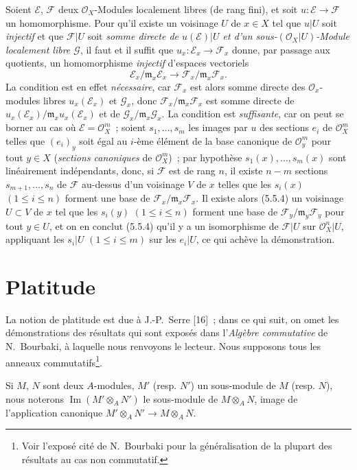 \begin{env}[5.5.5]
\label{0.5.5.5-fr}
Soient $\mathcal{E}$, $\mathcal{F}$ deux $\mathcal{O}_X$-Modules localement
libres (de rang fini), et soit $u:\mathcal{E}\to\mathcal{F}$ un
homomorphisme. Pour qu'il existe un voisinage $U$ de $x\in X$ tel que $u|U$
soit \emph{injectif} et que $\mathcal{F}|U$ soit \emph{somme directe de
$u(\mathcal{E})|U$ et d'un sous-$(\mathcal{O}_X|U)$-Module localement libre
$\mathcal{G}$}, il faut et il suffit que
$u_x:\mathcal{E}_x\to\mathcal{F}_x$ donne, par passage aux quotients, un
homomorphisme \emph{injectif} d'espaces vectoriels
\[
  \mathcal{E}_x/\mathfrak{m}_x\mathcal{E}_x
  \longrightarrow
  \mathcal{F}_x/\mathfrak{m}_x\mathcal{F}_x.
\]
La condition est en effet \emph{nécessaire}, car $\mathcal{F}_x$ est alors
somme directe des $\mathcal{O}_x$-modules libres $u_x(\mathcal{E}_x)$ et
$\mathcal{G}_x$, donc $\mathcal{F}_x/\mathfrak{m}_x\mathcal{F}_x$ est somme
directe de
$u_x(\mathcal{E}_x)/\mathfrak{m}_x u_x(\mathcal{E}_x)$ et de
$\mathcal{G}_x/\mathfrak{m}_x\mathcal{G}_x$. La condition est
\emph{suffisante}, car on peut se borner au cas où
$\mathcal{E}=\mathcal{O}_X^m$~; soient $s_1,\ldots,s_m$ les images par $u$ des
sections $e_i$ de $\mathcal{O}_X^m$ telles que $(e_i)_y$ soit égal au $i$-ème
élément de la base canonique de $\mathcal{O}_y^m$ pour tout $y\in X$
(\emph{sections canoniques} de $\mathcal{O}_X^m$)~; par hypothèse
$s_1(x),\ldots,s_m(x)$ sont linéairement indépendants, donc, si $\mathcal{F}$
est de rang $n$, il existe $n-m$ sections $s_{m+1},\ldots,s_n$ de
$\mathcal{F}$ au-dessus d'un voisinage $V$ de $x$ telles que les $s_i(x)$
$(1\leq i\leq n)$ forment une base de
$\mathcal{F}_x/\mathfrak{m}_x\mathcal{F}_x$. Il existe alors (5.5.4) un
voisinage $U\subset V$ de $x$ tel que les $s_i(y)$ $(1\leq i\leq n)$ forment
une base de $\mathcal{F}_y/\mathfrak{m}_y\mathcal{F}_y$ pour tout $y\in U$,
et on en conclut (5.5.4) qu'il y a un isomorphisme de $\mathcal{F}|U$ sur
$\mathcal{O}_X^n|U$, appliquant les $s_i|U$ $(1\leq i\leq m)$ sur les
$e_i|U$, ce qui achève la démonstration.
\end{env}

\section{Platitude}
\label{section:0.6-fr}

\begin{env}[6.0]
\label{0.6.0.0-fr}
La notion de platitude est due à J.-P.~Serre [16]~; dans ce qui suit, on omet
les démonstrations des résultats qui sont exposés dans l'\emph{Algèbre
commutative} de N.~Bourbaki, à laquelle nous renvoyons le lecteur. Nous
supposons tous les anneaux commutatifs\footnote{Voir l'exposé cité de
N.~Bourbaki pour la généralisation de la plupart des résultats au cas non
commutatif.}.


Si $M$, $N$ sont deux $A$-modules, $M'$ (resp. $N'$) un sous-module de $M$
(resp. $N$), nous noterons $\operatorname{Im}(M'\otimes_A N')$ le sous-module
de $M\otimes_A N$, image de l'application canonique
$M'\otimes_A N'\to M\otimes_A N$.
\end{env}

